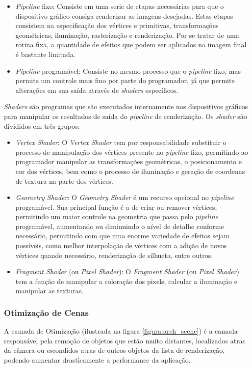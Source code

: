 \documentclass[12pt,	openright, twoside,	a4paper, english, french, spanish, brazil]{abntex2}
\begin{document}
\begin{itemize}
\item \textit{Pipeline} fixo: Consiste em uma serie de etapas necessárias para que o dispositivo gráfico consiga renderizar as imagens desejadas. Estas etapas consistem na especificação dos vértices e primitivas, transformações geométricas, iluminação, rasterização e renderização. Por se tratar de uma rotina fixa, a quantidade de efeitos que podem ser aplicados na imagem final é bastante limitada.
\item \textit{Pipeline} programável: Consiste no mesmo processo que o \textit{pipeline} fixo, mas permite um controle mais fino por parte do programador, já que permite alterações em sua saída através de \textit{shaders} específicos.
\end{itemize}

\textit{Shaders} são programas que são executados internamente nos dispositivos gráficos para manipular os resultados de saída do \textit{pipeline} de renderização. Os \textit{shader} são divididos em três grupos:

\begin{itemize}
\item \textit{Vertex Shader}: O \textit{Vertex Shader} tem por responsabilidade substituir o processo de manipulação dos vértices presente no \textit{pipeline} fixo, permitindo ao programador manipular as transformações geométricas, o posicionamento e cor dos vértices, bem como o processo de iluminação e geração de coordenas de textura na parte dos vértices.
\item \textit{Geometry Shader}: O \textit{Geometry Shader} é um recurso opcional no \textit{pipeline} programável. Sua principal função é a de criar ou remover vértices, permitindo um maior controle na geometria que passa pelo \textit{pipeline} programável, aumentando ou diminuindo o nível de detalhe conforme necessário, permitindo com que uma enorme variedade de efeitos sejam possíveis, como melhor interpolação de vértices com a adição de novos vértices quando necessário, renderização de silhueta, entre outros.
\item \textit{Fragment Shader} (ou \textit{Pixel Shader}): O \textit{Fragment Shader} (ou \textit{Pixel Shader}) tem a função de manipular a coloração dos pixels, calcular a iluminação e manipular as texturas.
\end{itemize}

\subsubsection{Otimização de Cenas}
A camada de Otimização (ilustrada na figura \ref{figura:arch_scene}) é a camada responsável pela remoção de objetos que estão muito distantes, localizados atras da câmera ou escondidos atras de outros objetos da lista de renderização, podendo aumentar drasticamente a performance da aplicação.
\end{document}
